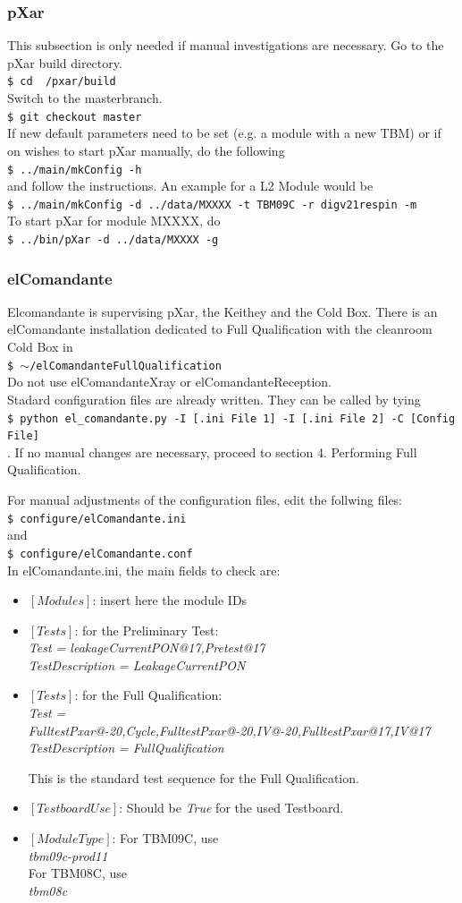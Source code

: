 \documentclass[fleqn,10pt]{SelfArx} %
\newcommand{\shellcmd}[1]{\\\indent\indent\texttt{\footnotesize\$ #1}\\}
\begin{document}
\subsubsection{pXar}
This subsection is only needed if manual investigations are necessary.
Go to the pXar build directory. 
\shellcmd{cd ~/pxar/build}
Switch to the masterbranch.
\shellcmd{git checkout master}
If new default parameters need to be set (e.g. a module with a new TBM) or if on wishes to start pXar manually, do the following
\shellcmd{../main/mkConfig -h }
and follow the instructions. An example for a L2 Module would be 
\shellcmd{../main/mkConfig -d ../data/MXXXX -t TBM09C -r digv21respin -m}
To start pXar for module MXXXX, do
\shellcmd{../bin/pXar -d ../data/MXXXX -g}

\subsubsection{elComandante}\label{elcom}
Elcomandante is supervising pXar, the Keithey and the Cold Box. There is an elComandante installation dedicated to Full Qualification with the cleanroom Cold Box in 
\shellcmd{ $\sim$/elComandanteFullQualification} 
Do not use elComandanteXray or elComandanteReception. \\

Stadard configuration files are already written. They can be called by tying 
\shellcmd{python el\_comandante.py -I [.ini File 1] -I [.ini File 2] -C [Config File]}. If no manual changes are necessary, proceed to section 4. Performing Full Qualification.

For manual adjustments of the configuration files, edit the follwing files:
\shellcmd{configure/elComandante.ini}
and
\shellcmd{configure/elComandante.conf}
In elComandante.ini, the main fields to check are:
\begin{itemize}
\item $[Modules]$: insert here the module IDs
\item $[Tests]$: for the Preliminary Test:\\
{\it Test = leakageCurrentPON@17,Pretest@17}\\
{\it TestDescription = LeakageCurrentPON}

\item $[Tests]$: for the Full Qualification:\\
{\it Test = FulltestPxar@-20,Cycle,FulltestPxar@-20,IV@-20,FulltestPxar@17,IV@17}\\
{\it TestDescription = FullQualification}

This is the standard test sequence for the Full Qualification.
\item $[TestboardUse]$: Should be {\it True} for the used Testboard.
\item $[ModuleType]$: 
For TBM09C, use \\
{\it tbm09c-prod11}\\
For TBM08C, use \\
{\it tbm08c}
\end{itemize}
\end{document}
